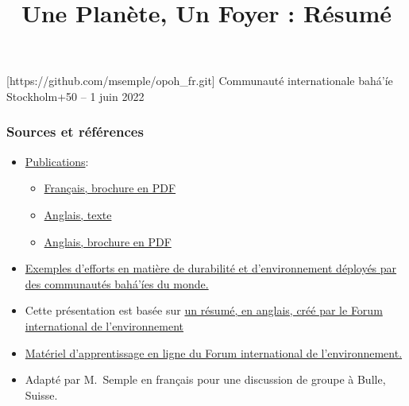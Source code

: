 \documentclass[11pt,xcolor={dvipsnames},hyperref={pdftex,pdfpagemode=UseNone,hidelinks,pdfdisplaydoctitle=true},usepdftitle=false]{beamer}
\begin{document}
\title{Une Planète, Un Foyer : Résumé}
\information%
[https://github.com/msemple/opoh_fr.git]%
{Communauté internationale bahá’íe}%
{Stockholm+50 -- 1 juin 2022}
\frame{\titlepage}

\begin{frame}
  \frametitle{Sources et références}
  \begin{itemize}
    \item \href{https://www.bic.org/publications/one-planet-one-habitation}%
      {Publications}:
      \begin{itemize}
        \item
          \href{https://www.bic.org/sites/default/files/pdf/opoh_magazine-french-online.pdf}%
          {Français, brochure en PDF}
        \item
          \href{https://www.bic.org/statements/one-planet-one-habitation-bahai-perspective-recasting-humanitys-relationship-natural-world}%
          {Anglais, texte}
        \item
          \href{https://www.bic.org/sites/default/files/pdf/one_planet_one_habitation.pdf}%
          {Anglais, brochure en PDF}
      \end{itemize}
    \item
      \href{https://opoh.bic.org}{Exemples d'efforts en matière de durabilité
      et d'environnement déployés par des communautés bahá'íes du monde.}
    \item Cette présentation est basée sur
      \href{https://iefworld.org/fl/OPOHsummary.pdf}%
      {un résumé, en anglais, créé par le Forum international de l'environnement}
    \item
      \href{https://iefworld.org/elcentre.htm}%
      {Matériel d'apprentissage en ligne du Forum international de l'environnement.}
    \item Adapté par M.\ Semple en français pour une discussion de groupe à
      Bulle, Suisse.
  \end{itemize}
\end{frame}
\end{document}
